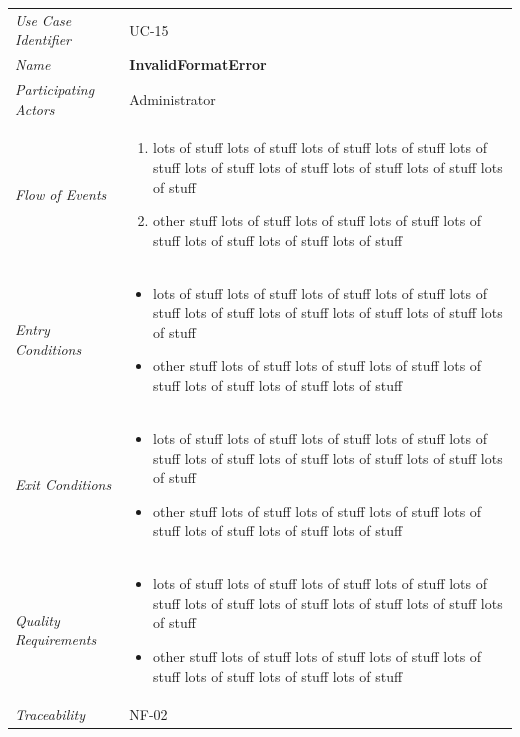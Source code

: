 \documentclass[12pt,letterpaper]{article}
\begin{document}
\begin{center}
	\begin{tabu} to 
		\toprule
		Use Case Identifier & UC-15 \\
		Name & {\bf InvalidFormatError} \\
		Participating Actors & Administrator \\
		Flow of Events & 
	    \begin{enumerate}[topsep=-1em]
		    \item lots of stuff lots of stuff lots of stuff lots of stuff lots of stuff lots of stuff lots of stuff lots of stuff lots of stuff lots of stuff
		    \item other stuff lots of stuff lots of stuff lots of stuff lots of stuff lots of stuff lots of stuff lots of stuff
		\end{enumerate} \\

		Entry Conditions &
		\begin{itemize}[topsep=-1em]
		    \item lots of stuff lots of stuff lots of stuff lots of stuff lots of stuff lots of stuff lots of stuff lots of stuff lots of stuff lots of stuff
		    \item other stuff lots of stuff lots of stuff lots of stuff lots of stuff lots of stuff lots of stuff lots of stuff
        \end{itemize} \\

		Exit Conditions &
		\begin{itemize}[topsep=-1em]
		    \item lots of stuff lots of stuff lots of stuff lots of stuff lots of stuff lots of stuff lots of stuff lots of stuff lots of stuff lots of stuff
		    \item other stuff lots of stuff lots of stuff lots of stuff lots of stuff lots of stuff lots of stuff lots of stuff
        \end{itemize} \\

		Quality Requirements &
		\begin{itemize}[topsep=-1em]
		    \item lots of stuff lots of stuff lots of stuff lots of stuff lots of stuff lots of stuff lots of stuff lots of stuff lots of stuff lots of stuff
		    \item other stuff lots of stuff lots of stuff lots of stuff lots of stuff lots of stuff lots of stuff lots of stuff
        \end{itemize} \\

		Traceability & NF-02 \\
		\toprule
	\end{tabu}
\end{center}
\end{document}
